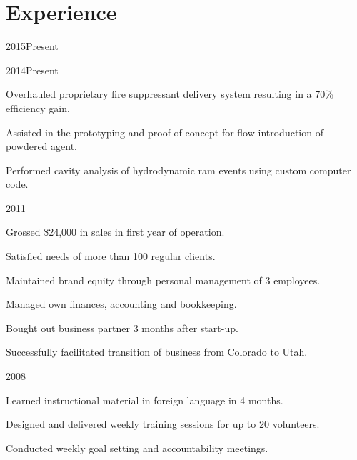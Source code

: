 \documentclass[letterpaper,10pt]{resume}
\begin{document}
	\section{Experience}
	{2015\textendash Present}
	\begin{compactitem}
		\item 
		\item 
		\item 
	\end{compactitem}
	{2014\textendash Present}
	\begin{compactitem}
		\item Overhauled proprietary fire suppressant delivery system resulting in a 70\% efficiency gain.
		\item Assisted in the prototyping and proof of concept for flow introduction of powdered agent. 
		\item Performed cavity analysis of hydrodynamic ram events using custom computer code.
	\end{compactitem}
	
	{2011}
	\begin{compactitem}
		\item Grossed \$24,000 in sales in first year of operation.
		\item Satisfied needs of  more than 100 regular clients.
		\item Maintained brand equity through personal management of 3 employees.
		\item Managed own finances, accounting and bookkeeping.
		\item Bought out business partner 3 months after start-up.
		\item Successfully facilitated transition of business from Colorado to Utah.
	\end{compactitem}
	
	{2008}
	\begin{compactitem}
		\item Learned instructional material in foreign language in 4 months.
		\item Designed and delivered weekly training sessions for up to 20 volunteers.
		\item Conducted weekly goal setting and accountability meetings.
	\end{compactitem}
	
\end{document}
